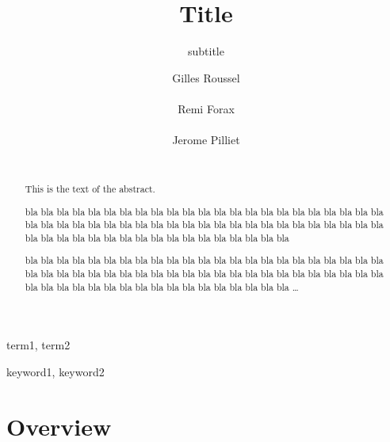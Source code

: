 \documentclass{sig-alternate}
\begin{document}

\title{Title}
\subtitle{subtitle}

\author{
  \alignauthor Gilles Roussel\\
    \\
  \alignauthor Remi Forax\\
    \\
  \alignauthor Jerome Pilliet\\
    \\
}

\setlength{\pdfpageheight}{\paperheight}
\setlength{\pdfpagewidth}{\paperwidth}

\maketitle

\begin{abstract}
This is the text of the abstract.

bla bla bla bla bla bla bla bla bla
bla bla bla bla bla bla bla bla bla
bla bla bla bla bla bla bla bla bla
bla bla bla bla bla bla bla bla bla
bla bla bla bla bla bla bla bla bla
bla bla bla bla bla bla bla bla bla
bla bla bla bla bla bla bla bla bla

bla bla bla bla bla bla bla bla bla
bla bla bla bla bla bla bla bla bla
bla bla bla bla bla bla bla bla bla
bla bla bla bla bla bla bla bla bla
bla bla bla bla bla bla bla bla bla
bla bla bla bla bla bla bla bla bla
bla bla bla bla bla bla bla bla bla
\dots
\end{abstract}


\terms
term1, term2

\keywords
keyword1, keyword2

\section{Overview}
\end{document}
